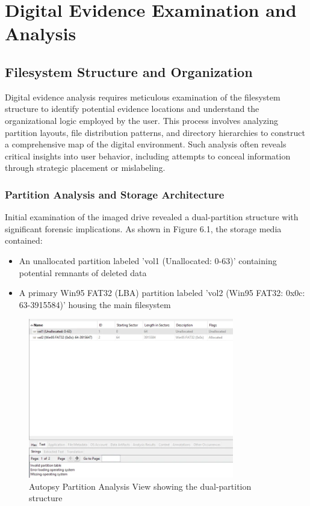 \chapter{Digital Evidence Examination and Analysis}

\section{Filesystem Structure and Organization}
Digital evidence analysis requires meticulous examination of the filesystem structure to identify potential evidence locations and understand the organizational logic employed by the user. This process involves analyzing partition layouts, file distribution patterns, and directory hierarchies to construct a comprehensive map of the digital environment. Such analysis often reveals critical insights into user behavior, including attempts to conceal information through strategic placement or mislabeling.

\subsection{Partition Analysis and Storage Architecture}
Initial examination of the imaged drive revealed a dual-partition structure with significant forensic implications. As shown in Figure 6.1, the storage media contained:

\begin{itemize}
    \item An unallocated partition labeled 'vol1 (Unallocated: 0-63)' containing potential remnants of deleted data
    \item A primary Win95 FAT32 (LBA) partition labeled 'vol2 (Win95 FAT32: 0x0c: 63-3915584)' housing the main filesystem
\end{itemize}

\begin{figure}[htbp]
    \centering
    \includegraphics[width=0.8\textwidth]{images/Evidence Examination/Image1.png}
    \caption{Autopsy Partition Analysis View showing the dual-partition structure}
    \label{fig:partition_structure}
\end{figure}

